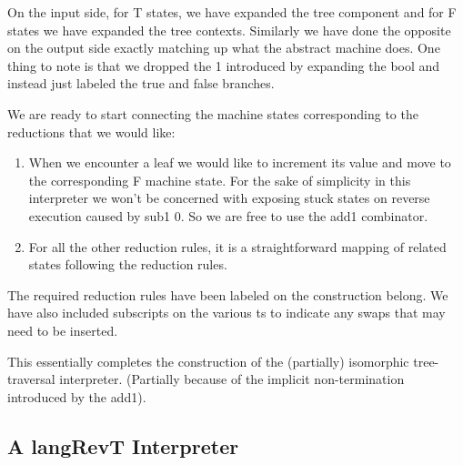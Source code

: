 \documentclass{llncs}
\begin{document}
{On the input side, for {{T}} states, we have expanded the tree component and
for {{F}} states we have expanded the tree contexts. Similarly we have done
the opposite on the output side exactly matching up what the abstract machine
does. One thing to note is that we dropped the {{1}} introduced by expanding
the {{bool}} and instead just labeled the {{true}} and {{false}} branches.

We are ready to start connecting the machine states corresponding to
the reductions that we would like:
\begin{enumerate}
\item When we encounter a leaf we would like to increment its value and move
  to the corresponding {{F}} machine state. For the sake of simplicity in
  this interpreter we won't be concerned with exposing stuck states on
  reverse execution caused by {{sub1 0}}. So we are free to use the {{add1}}
  combinator.

\item For all the other reduction rules, it is a straightforward mapping of
  related states following the reduction rules.

\end{enumerate}

The required reduction rules have been labeled on the construction
belong. We have also included subscripts on the various {{t}}s to
indicate any swaps that may need to be inserted.

\begin{center}
\end{center}

This essentially completes the construction of the (partially)
isomorphic tree-traversal interpreter. (Partially because of the
implicit non-termination introduced by the {{add1}}).


\subsection{A {{langRevT}} Interpreter}

%


}
\end{document}
